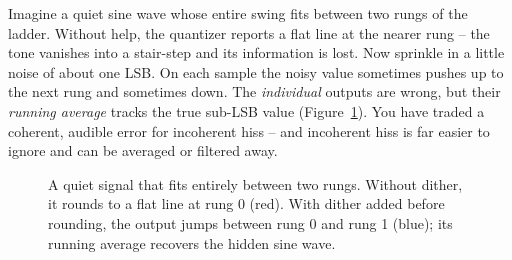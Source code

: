 \begin{intuitionbox}
Imagine a quiet sine wave whose entire swing fits between two rungs of the ladder. Without help,
the quantizer reports a flat line at the nearer rung -- the tone vanishes into a stair-step and
its information is lost. Now sprinkle in a little noise of about one LSB. On each sample the noisy
value sometimes pushes up to the next rung and sometimes down. The \emph{individual} outputs are
wrong, but their \emph{running average} tracks the true sub-LSB value (Figure~\ref{ch19:fig-dither}). You have traded a coherent,
audible error for incoherent hiss -- and incoherent hiss is far easier to ignore and can be
averaged or filtered away.
\end{intuitionbox}
\begin{figure}[htbp]
\centering
{}
\caption{A quiet signal that fits entirely between two rungs. Without dither, it rounds to a flat line at rung 0 (red). With dither added before rounding, the output jumps between rung 0 and rung 1 (blue); its running average recovers the hidden sine wave.}
\label{ch19:fig-dither}
\end{figure}


